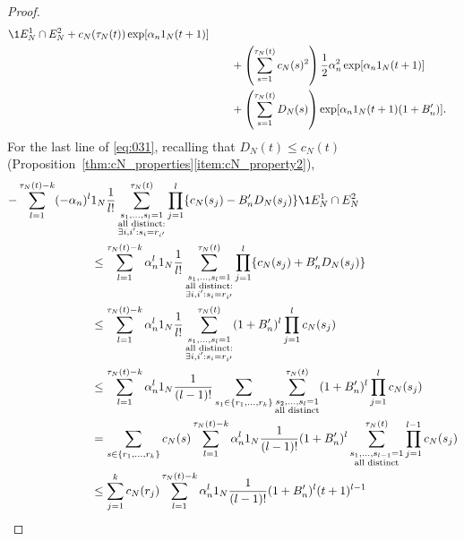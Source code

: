 \begin{proof}
\begin{align*}
        \1{E_N^1 \cap E_N^2}
        + c_N(\tau_N(t)) \exp[ \alpha_n \ON (t+1) ] \\
    &\qquad+ \left( \sum_{s=1}^{\tau_N(t)} c_N(s)^2 \right)
        \frac{1}{2} \alpha_n^2 \exp[ \alpha_n \ON (t+1) ] \\
    &\qquad+ \left( \sum_{s=1}^{\tau_N(t)} D_N(s) \right)
        \exp[ \alpha_n \ON (t+1) (1+B_n^\prime) ] .
\end{align*}
For the last line of \eqref{eq:031}, recalling that $D_N(t) \leq c_N(t)$ (Proposition~\ref{thm:cN_properties}\ref{item:cN_property2}),
\begin{align*}
- \sum_{l=1}^{\tau_N(t) -k} (-\alpha_n)^l &\ON \frac{1}{l!}
        \sum_{\substack{s_1, \dots, s_l =1 \\ \text{all distinct}: 
        \\ \exists i,i^\prime : s_i=r_{i^\prime} }}^{\tau_N(t)} 
        \prod_{j=1}^l \{ c_N(s_j) - B_n^\prime D_N(s_j) \} 
        \1{E_N^1 \cap E_N^2} \\
&\leq \sum_{l=1}^{\tau_N(t) -k} \alpha_n^l \ON \frac{1}{l!}
        \sum_{\substack{s_1, \dots, s_l =1 \\ \text{all distinct}: 
        \\ \exists i,i^\prime : s_i=r_{i^\prime} }}^{\tau_N(t)} 
        \prod_{j=1}^l \{ c_N(s_j) + B_n^\prime D_N(s_j) \} \\
&\leq \sum_{l=1}^{\tau_N(t) -k} \alpha_n^l \ON \frac{1}{l!}
        \sum_{\substack{s_1, \dots, s_l =1 \\ \text{all distinct}: 
        \\ \exists i,i^\prime : s_i=r_{i^\prime} }}^{\tau_N(t)} 
        (1 + B_n^\prime)^l \prod_{j=1}^l c_N(s_j) \\
&\leq \sum_{l=1}^{\tau_N(t) -k} \alpha_n^l \ON
        \frac{1}{(l-1)!} \sum_{s_1 \in \{r_1,\dots,r_k\} } 
        \sum_{\substack{ s_2, \dots, s_l =1 \\ \text{all distinct} }}^{\tau_N(t)}
        (1 + B_n^\prime)^l \prod_{j=1}^l c_N(s_j) \\
&= \sum_{s \in \{r_1,\dots,r_k\} } c_N(s)
        \sum_{l=1}^{\tau_N(t) -k} \alpha_n^l \ON
        \frac{1}{(l-1)!}  (1 + B_n^\prime)^l
        \sum_{\substack{ s_1, \dots, s_{l-1} =1 \\ \text{all distinct} }}^{\tau_N(t)}
        \prod_{j=1}^{l-1} c_N(s_j) \\
&\leq \sum_{j=1}^k c_N(r_j)
        \sum_{l=1}^{\tau_N(t) -k} \alpha_n^l \ON
        \frac{1}{(l-1)!}  (1 + B_n^\prime)^l (t+1)^{l-1} \\

\end{align*}
\end{proof}
